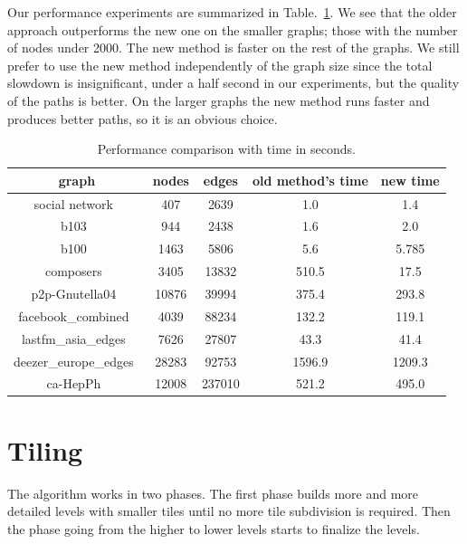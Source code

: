\documentclass{gd-llncs}
\begin{document}
{Our performance experiments are summarized in Table.~\ref{tab:perf}. We see that the older approach outperforms the new one on the smaller graphs; those with the number of nodes under 2000. The new method is faster on the rest of the graphs. We still prefer to use the new method independently of the graph size since the total slowdown is insignificant, under a half second in our experiments, but the quality of the paths is better. On the larger graphs the new method runs faster and produces better paths, so it is an obvious choice.
\begin{table}
  \begin{center}
    \begin{tabular}{||c |c| c| c| c||}
      \hline
      graph                                   & nodes & edges  & old method's time & new time \\ [0.5ex]
      \hline\hline
      social network~\cite{beveridge2018game} & 407   & 2639   & 1.0               & 1.4      \\
      \hline
      b103~\cite{b103}                        & 944   & 2438   & 1.6               & 2.0      \\
      \hline
      b100~\cite{b100}                        & 1463  & 5806   & 5.6               & 5.785    \\
      \hline
      composers~\cite{composers}              & 3405  & 13832  & 510.5             & 17.5     \\
      \hline
      p2p-Gnutella04~\cite{gnutella}          & 10876 & 39994  & 375.4             & 293.8    \\
      \hline
      facebook\_combined~\cite{fb}            & 4039  & 88234  & 132.2             & 119.1    \\
      \hline
      lastfm\_asia\_edges~\cite{feather}      & 7626  & 27807  & 43.3              & 41.4     \\
      \hline
      deezer\_europe\_edges~\cite{feather}    & 28283 & 92753  & 1596.9            & 1209.3   \\
      \hline
      ca-HepPh~\cite{leskovec2007graph}       & 12008 & 237010 & 521.2             & 495.0    \\
      \hline
    \end{tabular}
    \caption{Performance comparison with time in seconds.}
    \label{tab:perf}
  \end{center}

\end{table}
\section{Tiling}
The algorithm works in two phases. The first phase builds more and more detailed levels with smaller tiles until no more tile subdivision is required. Then the phase going from the higher to lower levels starts to finalize the levels.


}
\end{document}
